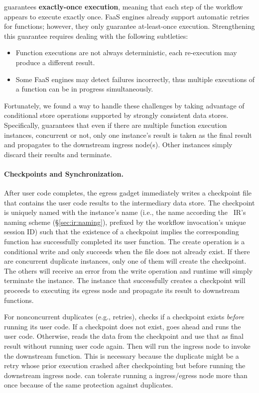 \name{} guarantees \textbf{exactly-once execution}, meaning that each step of
the workflow appears to execute exactly once. FaaS engines already
support automatic retries for functions; however, they only guarantee at-least-once
execution. Strengthening this guarantee requires dealing with the following
subtleties:

\begin{itemize}
	\item Function executions are not always deterministic, each re-execution
	may produce a different result.
	\item Some FaaS engines may detect failures incorrectly, thus multiple
	executions of a function can be in progress simultaneously.
\end{itemize}

Fortunately, we found a way to handle these challenges by taking advantage of
conditional store operations supported by strongly consistent data stores.
Specifically, \name{} guarantees that even if there are multiple function
execution instances, concurrent or not, only one instance's result is taken as
the final result and propagates to the downstream ingress node(s). Other
instances simply discard their results and terminate.

\paragraph{Checkpoints and Synchronization.}%
After user code completes, the \name{} egress gadget immediately writes a checkpoint file that contains the user code
results to the intermediary data store. The checkpoint is uniquely named with
the instance's name (i.e., the name according the
\name{}~IR's naming scheme (\S\ref{sec:ir:naming}), prefixed by the workflow
invocation's unique session ID) such that the existence of a checkpoint
implies the corresponding function has successfully completed its user
function. The create operation is a conditional write and only succeeds when
the file does not already exist. If there are concurrent duplicate instances,
only one of them will create the checkpoint. The others will receive an error
from the write operation and \name{} runtime will simply terminate the
instance. The instance that successfully creates a checkpoint will proceeds to
executing its egress node and propagate its result to downstream functions.

For nonconcurrent duplicates (e.g., retries), \name{} checks if a checkpoint
exists \emph{before} running its user code. If a checkpoint does not exist,
\name{} goes ahead and runs the user code. Otherwise, \name{} reads the data
from the checkpoint and use that as final result without running user code
again. Then \name{} will run the ingress node to invoke the downstream function.
This is necessary because the duplicate might be a retry whose prior execution
crashed after checkpointing but before running the downstream ingress node. \name{} can
tolerate running a ingress/egress node more than once because of the same protection
against duplicates.

